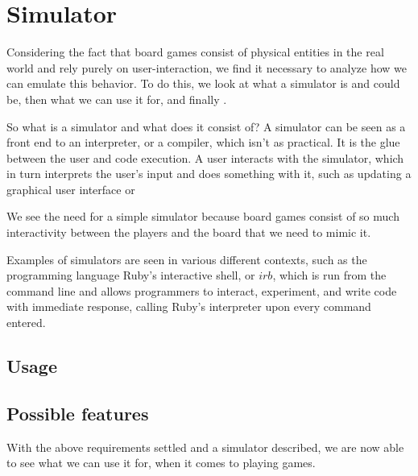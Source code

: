 \section{Simulator}
Considering the fact that board games consist of physical entities in the real world and rely purely on user-interaction, we find it necessary to analyze how we can emulate this behavior. To do this, we look at what a simulator is and could be, then what we can use it for, and finally .

So what is a simulator and what does it consist of? A simulator can be seen as a front end to an interpreter, or a compiler, which isn't as practical. It is the glue between the user and code execution. A user interacts with the simulator, which in turn interprets the user's input and does something with it, such as updating a graphical user interface or  

We see the need for a simple simulator because board games consist of so much interactivity between the players and the board that we need to mimic it.

Examples of simulators are seen in various different contexts, such as the programming language Ruby's \cite{rubyLang} interactive shell, or $irb$, which is run from the command line and allows programmers to interact, experiment, and write code with immediate response, calling Ruby's interpreter upon every command entered.


\subsection{Usage}



\subsection{Possible features}
With the above requirements settled and a simulator described, we are now able to see what we can use it for, when it comes to playing games.


